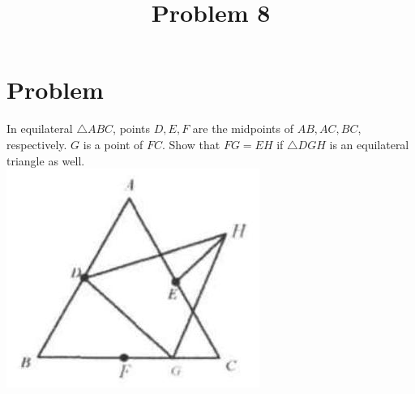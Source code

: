 \documentclass{article}
\title{Problem 8}
\date{}
\begin{document}
\maketitle

\section*{Problem}
In equilateral \(\triangle A B C\), points \(D, E, F\) are the midpoints of \(A B, A C, B C\), respectively. \(G\) is a point of \(F C\). Show that \(F G=E H\) if \(\triangle D G H\) is an equilateral triangle as well.\\
\centering
\includegraphics[width=\textwidth]{images/problem_image_1.jpg}
\end{document}
